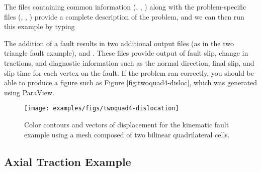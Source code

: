 The files containing common information (,
, ) along with
the problem-specific files (,
,
) provide a complete
description of the problem, and we can then run this example by typing
The addition of a fault results in two additional output files (as in
the two triangle fault example),
 and
.  These files provide output of
fault slip, change in tractions, and diagnostic information such as
the normal direction, final slip, and slip time for each vertex on the
fault. If the problem ran correctly, you should be able to produce a
figure such as Figure \vref{fig:twoquad4-disloc}, which was generated
using ParaView.

\begin{figure}
  \texttt{[image: examples/figs/twoquad4-dislocation]}
  \caption{Color contours and vectors of displacement for the kinematic fault
    example using a mesh composed of two bilinear quadrilateral cells.}
  \label{fig:twoquad4-disloc}
\end{figure}


\subsection{Axial Traction Example}
\label{sec:examples:twoquad4-traction}

